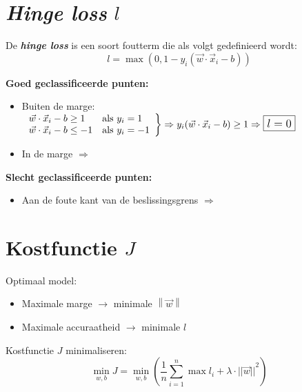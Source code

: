 \documentclass[kulak]{kulakposter}
\newcommand{\norm}[1]{\left\| #1 \right\|}
\renewcommand{\boxed}[1]{\text{\fboxsep=.3em\fbox{#1}}}
\begin{document}
\begin{multicols}{2}
	
	\section{\textit{Hinge loss} \(l\)}
	
	De \textbf{\textit{hinge loss}} is een soort foutterm die als volgt gedefinieerd wordt:
	\large\[l=\max{(0,1-y_i(\vec{w}\cdot\vec{x}_i-b))}\]
	
	\normalsize
	
	\vspace{0.5cm}
	
		\textbf{Goed geclassificeerde punten:}
		\begin{itemize}
			\item Buiten de marge:\\
			\(\left. \begin{array}{ll}
				\vec{w}\cdot \vec{x}_i-b\geq 1 & \text{als } y_i=1 \\
				\vec{w}\cdot \vec{x}_i-b\leq -1 & \text{als } y_i=-1
			\end{array} \right\} \Rightarrow y_i(\vec{w}\cdot \vec{x}_i-b)\geq 1 \large \Rightarrow \boxed{$l=0$} \)
			\item In de marge \large \(\Rightarrow\) \boxed{$0<l\leq 1$}
		\end{itemize}
		\vspace{0.5cm}
		\textbf{Slecht geclassificeerde punten:}
		\begin{itemize}
			\item Aan de foute kant van de beslissingsgrens \large \(\Rightarrow\) \boxed{$l > 1$}
		\end{itemize}
	
\section{Kostfunctie \(J\)}
\begin{multicols}{2}
	Optimaal model:
	\begin{itemize}
		\item Maximale marge \(\rightarrow\) minimale \(\norm{\vec{w}}\)
		\item Maximale accuraatheid \(\rightarrow\) minimale \(l\)
	\end{itemize}
	\columnbreak
	Kostfunctie \(J\) minimaliseren:
	\large\[\min_{w,b}J=\min_{w,b}\left(\frac{1}{n} \sum_{i=1}^n{\max{l_i}} + \lambda\cdot{||\vec{w}||}^2\right)\]
\end{multicols}
\normalsize
\columnbreak


\end{multicols}
\end{document}
